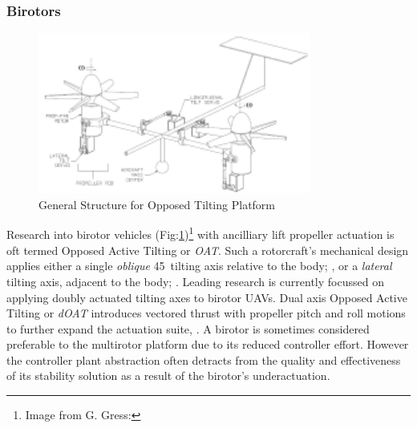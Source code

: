 \subsubsection*{Birotors}
\begin{figure}[hbtp]
\centering
\includegraphics[width=0.8\textwidth]{figs/dualaxistilt}
\caption{General Structure for Opposed Tilting Platform}
\label{fig:dualaxistilt}
\end{figure}
Research into birotor vehicles (Fig:\ref{fig:dualaxistilt})\footnote{Image from G. Gress:\cite{gres2007}} with ancilliary lift propeller actuation is oft termed Opposed Active Tilting or \emph{OAT}. Such a rotorcraft's mechanical design applies either a single \emph{oblique} 45\textdegree ~tilting axis relative to the body; \cite{smalltwotilting,obliquepitch,passiveobliquetilting}, or a \emph{lateral} tilting axis, adjacent to the body; \cite{tiltrotorUAV,adaptivebackstep,tiltrotorcontrol,tpheonix}. Leading research is currently focussed on applying doubly actuated tilting axes to birotor UAVs. Dual axis Opposed Active Tilting or \emph{dOAT} introduces vectored thrust with propeller pitch and roll motions to further expand the actuation suite, \cite{gres2007,opposedlateraldualaxis}. A birotor is sometimes considered preferable to the multirotor platform due to its reduced controller effort. However the controller plant abstraction often detracts from the quality and effectiveness of its stability solution as a result of the birotor's underactuation. 
\par
